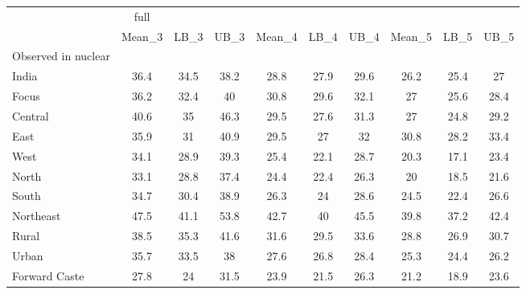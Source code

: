 \begin{tabular}{l*{9}{c}}
\toprule
                    &        full&            &            &            &            &            &            &            &            \\
                    &      Mean\_3&        LB\_3&        UB\_3&      Mean\_4&        LB\_4&        UB\_4&      Mean\_5&        LB\_5&        UB\_5\\
\midrule
Observed in nuclear &            &            &            &            &            &            &            &            &            \\
India               &        36.4&        34.5&        38.2&        28.8&        27.9&        29.6&        26.2&        25.4&          27\\
Focus               &        36.2&        32.4&          40&        30.8&        29.6&        32.1&          27&        25.6&        28.4\\
Central             &        40.6&          35&        46.3&        29.5&        27.6&        31.3&          27&        24.8&        29.2\\
East                &        35.9&          31&        40.9&        29.5&          27&          32&        30.8&        28.2&        33.4\\
West                &        34.1&        28.9&        39.3&        25.4&        22.1&        28.7&        20.3&        17.1&        23.4\\
North               &        33.1&        28.8&        37.4&        24.4&        22.4&        26.3&          20&        18.5&        21.6\\
South               &        34.7&        30.4&        38.9&        26.3&          24&        28.6&        24.5&        22.4&        26.6\\
Northeast           &        47.5&        41.1&        53.8&        42.7&          40&        45.5&        39.8&        37.2&        42.4\\
Rural               &        38.5&        35.3&        41.6&        31.6&        29.5&        33.6&        28.8&        26.9&        30.7\\
Urban               &        35.7&        33.5&          38&        27.6&        26.8&        28.4&        25.3&        24.4&        26.2\\
Forward Caste       &        27.8&          24&        31.5&        23.9&        21.5&        26.3&        21.2&        18.9&        23.6\\

\end{tabular}

